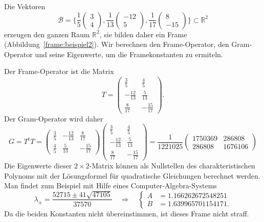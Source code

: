 \begin{beispiel}
Die Vektoren
\[
\mathcal{B} 
=
\biggl\{
\frac15
\begin{pmatrix} 3\\4\end{pmatrix},
\frac1{13}
\begin{pmatrix} -12\\5\end{pmatrix},
\frac1{17}
\begin{pmatrix} 8\\-15\end{pmatrix}
\biggr\}
\subset \mathbb R^2
\]
erzeugen den ganzen Raum $\mathbb R^2$, sie bilden daher ein
Frame (Abbildung~\ref{frame:beispiel2}).
Wir berechnen den Frame-Operator, den Gram-Operator und seine Eigenwerte,
um die Framekonstanten zu ermiteln.

Der Frame-Operator ist die Matrix
\[
T
=
\begin{pmatrix}
 \frac{ 3}{ 5}& \frac{ 4}{ 5}\\[2pt]
-\frac{12}{13}& \frac{ 5}{13}\\[2pt]
 \frac{ 8}{17}&-\frac{15}{17}
\end{pmatrix}.
\]
Der Gram-Operator wird daher
\[
G=T^tT
=
\begin{pmatrix}
 \frac{ 3}{ 5}&-\frac{12}{13}&  \frac{ 8}{17}\\[2pt]
 \frac{ 4}{ 5}& \frac{ 5}{13}& -\frac{15}{17}
\end{pmatrix}
\begin{pmatrix}
 \frac{ 3}{ 5}& \frac{ 4}{ 5}\\[2pt]
-\frac{12}{13}& \frac{ 5}{13}\\[2pt]
 \frac{ 8}{17}&-\frac{15}{17}
\end{pmatrix}
=
\frac{1}{1221025}
\begin{pmatrix}
1750369&  286808 \\
 286808& 1676106
\end{pmatrix}
\]
Die Eigenwerte dieser $2\times 2$-Matrix können als Nullstellen des
charakteristischen Polynoms mit der Lösungsformel für quadratische
Gleichungen berechnet werden.
Man findet zum Beispiel mit Hilfe eines Computer-Algebra-Systems
\[
\lambda_{\pm}
=
\frac{52715\pm 41\sqrt{47105}}{37570}
\quad\Rightarrow\quad
\left\{
\begin{aligned}
A&=
1.166262672548251
\\
B&=
1.639965701154171.
\end{aligned}
\right.
\]
Da die beiden Konstanten nicht übereinstimmen, ist dieses Frame
nicht straff.
\end{beispiel}


